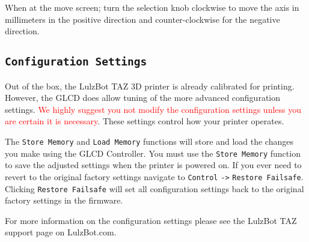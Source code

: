 When at the move screen; turn the selection knob clockwise to move the axis in millimeters in the positive direction and counter-clockwise for the negative direction. 

\subsection{\texttt{Configuration Settings}}


Out of the box, the LulzBot\textsuperscript{\miniscule{\texttrademark}} TAZ 3D printer is already calibrated for printing. However, the GLCD does allow tuning of the more advanced configuration settings. \textcolor{red}{We highly suggest you not modify the configuration settings unless you are certain it is necessary}. These settings control how your printer operates.


The \texttt{Store Memory} and \texttt{Load Memory} functions will store and load the changes you make using the GLCD Controller. You must use the \texttt{Store Memory} function to save the adjusted settings when the printer is powered on. If you ever need to revert to the original factory settings navigate to \texttt{Control} \texttt{->} \texttt{Restore Failsafe}. Clicking \texttt{Restore Failsafe} will set all configuration settings back to the original factory settings in the firmware.

For more information on the configuration settings please see the LulzBot\textsuperscript{\miniscule{\texttrademark}} TAZ support page on LulzBot.com.





